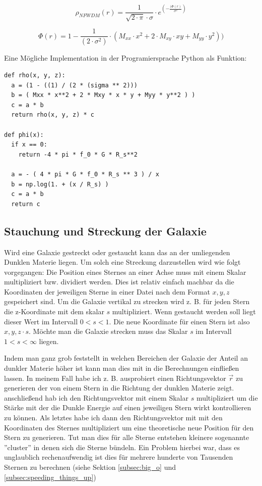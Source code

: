 \bigskip

\begin{equation}\label{eq:dark_matter}
  \rho_{NFWDM}(r) = \frac{1}{\sqrt{2 \cdot \pi} \cdot \sigma} \cdot
  e^{\left( - \frac{(\Phi(r)}{\sigma^{2}} \right)}
\end{equation}

\begin{equation}
  \Phi(r) = 1-\frac{1}{(2 \cdot \sigma^{2} )} \cdot
  ( M_{xx} \cdot x^{2} + 2 \cdot M_{xy} \cdot xy + M_{yy} \cdot y^{2} ))
\end{equation}

\bigskip

Eine Mögliche Implementation in der Programiersprache Python als Funktion:

\begin{lstlisting}
def rho(x, y, z):
  a = (1 - ((1) / (2 * (sigma ** 2)))
  b = ( Mxx * x**2 + 2 * Mxy * x * y + Myy * y**2 ) )
  c = a * b
  return rho(x, y, z) * c

def phi(x):
  if x == 0:
    return -4 * pi * f_0 * G * R_s**2

  a = - ( 4 * pi * G * f_0 * R_s ** 3 ) / x
  b = np.log(1. + (x / R_s) )
  c = a * b
  return c
\end{lstlisting}

\subsection{Stauchung und Streckung der Galaxie}

Wird eine Galaxie gestreckt oder gestaucht kann das an der umliegenden Dunklen
Materie liegen. Um solch eine Streckung darzustellen wird wie folgt vorgegangen:
Die Position eines Sternes an einer Achse muss mit einem Skalar multipliziert
bzw. dividiert werden.
Dies ist relativ einfach machbar da die Koordinaten der jeweiligen Sterne
in einer Datei nach dem Format \( x, y, z \) gespeichert sind.
Um die Galaxie vertikal zu strecken wird z. B. für jeden Stern die z-Koordinate
mit dem skalar \( s \) multipliziert. Wenn gestaucht werden soll liegt dieser
Wert im Intervall \( 0 < s < 1 \). Die neue Koordinate für einen Stern ist also
\( x, y, z \cdot s \). Möchte man die Galaxie strecken muss das Skalar \( s \)
im Intervall \( 1 < s < \infty \) liegen.

Indem man ganz grob feststellt in welchen Bereichen der Galaxie der Anteil an
dunkler Materie höher ist kann man dies mit in die Berechnungen einfließen lassen.
In meinem Fall habe ich z. B. ausprobiert einen Richtungsvektor \( \vec{r} \)
zu generieren der von einem Stern in die Richtung der dunklen Materie zeigt.
anschließend hab ich den Richtungsvektor mit einem Skalar \( s \) multipliziert
um die Stärke mit der die Dunkle Energie auf einen jeweiligen Stern wirkt
kontrollieren zu können. Als letztes habe ich dann den Richtungsvektor
mit mit den Koordinaten des Sternes multipliziert um eine theoretische neue
Position für den Stern zu generieren. Tut man dies für alle Sterne entstehen
kleinere sogenannte ''cluster'' in denen sich die Sterne bündeln. Ein Problem
hierbei war, dass es unglaublich rechenaufwendig ist dies für mehrere hunderte
von Tausenden Sternen zu berechnen (siehe Sektion \ref{subsec:big_o}
und \ref{subsec:speeding_things_up})

